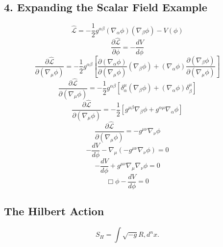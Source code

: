 \documentclass[11pt, a4paper]{report}
\begin{document}
\subsection*{4. Expanding the Scalar Field Example}
\begin{equation}
\hat{\mathcal{L}} = -\frac{1}{2} g^{\alpha\beta} (\nabla_\alpha \phi) (\nabla_\beta \phi) - V(\phi)
\end{equation}
\begin{equation}
\frac{\partial \hat{\mathcal{L}}}{\partial \phi} = - \frac{dV}{d\phi}
\end{equation}
\begin{equation}
\frac{\partial \hat{\mathcal{L}}}{\partial (\nabla_\mu \phi)} = -\frac{1}{2} g^{\alpha\beta} \left[ \frac{\partial (\nabla_\alpha \phi)}{\partial (\nabla_\mu \phi)} (\nabla_\beta \phi) + (\nabla_\alpha \phi) \frac{\partial (\nabla_\beta \phi)}{\partial (\nabla_\mu \phi)} \right]
\end{equation}
\begin{equation}
\frac{\partial \hat{\mathcal{L}}}{\partial (\nabla_\mu \phi)} = -\frac{1}{2} g^{\alpha\beta} \left[ \delta_\alpha^\mu (\nabla_\beta \phi) + (\nabla_\alpha \phi) \delta_\beta^\mu \right]
\end{equation}
\begin{equation}
\frac{\partial \hat{\mathcal{L}}}{\partial (\nabla_\mu \phi)} = -\frac{1}{2} \left[ g^{\mu\beta} \nabla_\beta \phi + g^{\alpha\mu} \nabla_\alpha \phi \right]
\end{equation}
\begin{equation}
\frac{\partial \hat{\mathcal{L}}}{\partial (\nabla_\mu \phi)} = -g^{\mu\nu} \nabla_\nu \phi
\end{equation}
\begin{equation}
- \frac{dV}{d\phi} - \nabla_\mu \left( -g^{\mu\nu} \nabla_\nu \phi \right) = 0
\end{equation}
\begin{equation}
- \frac{dV}{d\phi} + g^{\mu\nu} \nabla_\mu \nabla_\nu \phi = 0
\end{equation}
\begin{equation}
\Box \phi - \frac{dV}{d\phi} = 0
\end{equation}

\subsection{The Hilbert Action}
\begin{equation}
\label{eq:hilbert_action}
S_{H} = \int \sqrt{-g} R , d^{n}x.
\end{equation}
\end{document}

